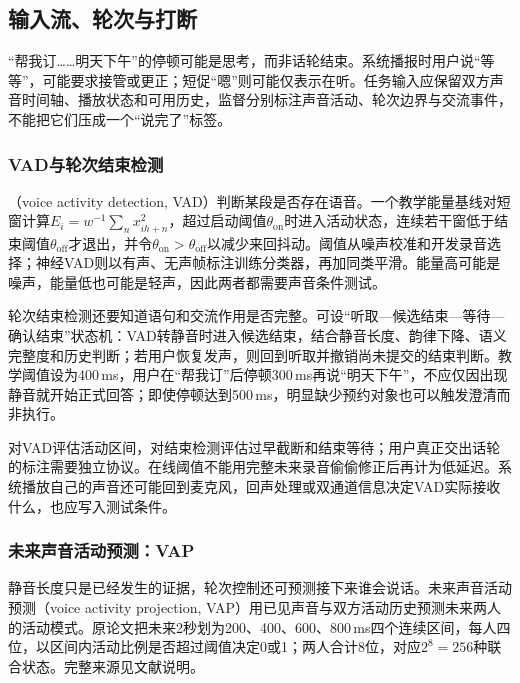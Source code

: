 \subsection{输入流、轮次与打断}
\label{sec:nlp-speech-turns}

“帮我订……明天下午”的停顿可能是思考，而非话轮结束。系统播报时用户说“等等”，可能要求接管或更正；短促“嗯”则可能仅表示在听。任务输入应保留双方声音时间轴、播放状态和可用历史，监督分别标注声音活动、轮次边界与交流事件，不能把它们压成一个“说完了”标签。

\subsubsection{VAD与轮次结束检测}
\label{sec:nlp-speech-vad}

（voice activity detection, VAD）判断某段是否存在语音。一个教学能量基线对短窗计算$E_i=w^{-1}\sum_nx_{ih+n}^2$，超过启动阈值$\theta_{\mathrm{on}}$时进入活动状态，连续若干窗低于结束阈值$\theta_{\mathrm{off}}$才退出，并令$\theta_{\mathrm{on}}>\theta_{\mathrm{off}}$以减少来回抖动。阈值从噪声校准和开发录音选择；神经VAD则以有声、无声帧标注训练分类器，再加同类平滑。能量高可能是噪声，能量低也可能是轻声，因此两者都需要声音条件测试。

轮次结束检测还要知道语句和交流作用是否完整。可设“听取—候选结束—等待—确认结束”状态机：VAD转静音时进入候选结束，结合静音长度、韵律下降、语义完整度和历史判断；若用户恢复发声，则回到听取并撤销尚未提交的结束判断。教学阈值设为400\,ms，用户在“帮我订”后停顿300\,ms再说“明天下午”，不应仅因出现静音就开始正式回答；即使停顿达到500\,ms，明显缺少预约对象也可以触发澄清而非执行。

对VAD评估活动区间，对结束检测评估过早截断和结束等待；用户真正交出话轮的标注需要独立协议。在线阈值不能用完整未来录音偷偷修正后再计为低延迟。系统播放自己的声音还可能回到麦克风，回声处理或双通道信息决定VAD实际接收什么，也应写入测试条件。

\subsubsection{未来声音活动预测：VAP}
\label{sec:nlp-speech-vap}

静音长度只是已经发生的证据，轮次控制还可预测接下来谁会说话。未来声音活动预测（voice activity projection, VAP）用已见声音与双方活动历史预测未来两人的活动模式。原论文把未来2秒划为200、400、600、800\,ms四个连续区间，每人四位，以区间内活动比例是否超过阈值决定0或1；两人合计8位，对应$2^8=256$种联合状态。完整来源见文献说明。

